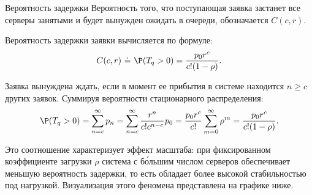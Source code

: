 \begin{center}
\begin{minipage}{0.48\textwidth}
\end{minipage}
\end{center}

\begin{definition}{Вероятность задержки}
Вероятность того, что поступающая заявка застанет все серверы занятыми и будет вынужден ожидать в очереди, обозначается $C(c, r)$.
\end{definition}

\begin{statement}
Вероятность задержки заявки вычисляется по формуле:
$$
C(c, r) \ \dot{=} \ \P(T_q > 0) = \frac{p_0 r^c}{c!(1-\rho)}.
$$
\end{statement}

\begin{sproof}
Заявка вынуждена ждать, если в момент ее прибытия в системе находится $n \ge c$ других заявок. Суммируя вероятности стационарного распределения:
$$
\P(T_q > 0) = \sum_{n=c}^{\infty} p_n = \sum_{n=c}^{\infty} \frac{r^n}{c! c^{n-c}} p_0 = \frac{p_0 r^c}{c!} \sum_{m=0}^{\infty} \rho^m = \frac{p_0 r^c}{c!(1-\rho)}.
$$
\end{sproof}

Это соотношение характеризует эффект масштаба: при фиксированном коэффициенте загрузки $\rho$ система с б\'{о}льшим числом серверов обеспечивает меньшую вероятность задержки, то есть обладает более высокой стабильностью под нагрузкой. Визуализация этого феномена представлена на графике ниже.

